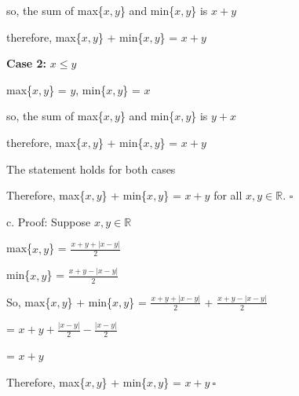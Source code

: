 \documentclass{article} %
\begin{document}
    \tabto{1.3cm} so, the sum of max\{$x, y$\} and min\{$x, y$\} is $x + y$

    \tabto{1.3cm} therefore, max\{$x, y$\} + min\{$x, y$\} = $x + y$

    \vspace*{0.1cm}

    \tabto{1cm} \textbf{Case 2:} $x \leq y$

    \tabto{1.3cm} max\{$x, y$\} = $y$, min\{$x, y$\} = $x$

    \tabto{1.3cm} so, the sum of max\{$x, y$\} and min\{$x, y$\} is $y + x$

    \tabto{1.3cm} therefore, max\{$x, y$\} + min\{$x, y$\} = $x + y$

    \vspace*{0.1cm}

    \tabto{1cm} The statement holds for both cases

    \tabto{1cm} Therefore, max\{$x, y$\} + min\{$x, y$\} = $x + y$ for all $x, y \in \mathbb{R}$. $\square$

    \vspace*{0.3cm}

    c. Proof: Suppose $x, y \in \mathbb{R}$
    
    \vspace*{0.1cm}

    \tabto{1cm} max\{$x, y$\} = $\frac{x + y + |x - y|}{2}$

    \vspace*{0.1cm}

    \tabto{1cm} min\{$x, y$\} = $\frac{x + y - |x - y|}{2}$

    \vspace*{0.1cm}

    \tabto{1cm} So, max\{$x, y$\} + min\{$x, y$\} = $\frac{x + y + |x - y|}{2}$ + $\frac{x + y - |x - y|}{2}$

    \vspace*{0.1cm}

    \tabto{5.25cm} = $x + y + \frac{|x-y|}{2} - \frac{|x-y|}{2}$

    \tabto{5.25cm} = $x + y$

    \tabto{1cm} Therefore, max\{$x, y$\} + min\{$x, y$\} = $x + y\ \square$

    \newpage

\end{document}
